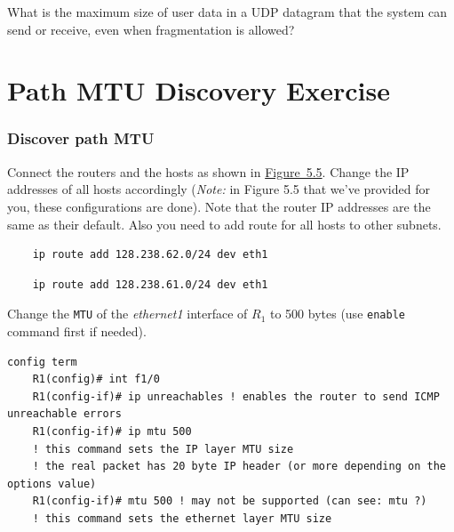 \documentclass{UTNetLab}
\begin{document}
    \begin{report}
    \item What is the maximum size of user data in a UDP datagram that the system can send or receive, even when fragmentation is allowed?
    \end{report}


\part{Path MTU Discovery Exercise}\label{sec:PMTUD}

\section{Discover path MTU}
    Connect the routers and the hosts as shown in \hyperref[fig:5.5]{Figure~5.5}. Change the IP addresses of all hosts accordingly (\textit{Note: }in Figure 5.5 that we've provided for you, these configurations are done).
    Note that the router IP addresses are the same as their default. Also you need to add route for all hosts to other subnets.
       
    \begin{lstlisting}
    ip route add 128.238.62.0/24 dev eth1            
    \end{lstlisting} 

    
    \begin{lstlisting}
    ip route add 128.238.61.0/24 dev eth1
    \end{lstlisting}


    Change the \texttt{MTU} of the \textit{ethernet1} interface of \textit{$R_{1}$} to 500 bytes (use \lstinline{enable} command first if needed).
    
\begin{lstlisting}[frame=trBL,language={cisco}]
	config term
	R1(config)# int f1/0
	R1(config-if)# ip unreachables ! enables the router to send ICMP unreachable errors
	R1(config-if)# ip mtu 500
	! this command sets the IP layer MTU size
	! the real packet has 20 byte IP header (or more depending on the options value)
	R1(config-if)# mtu 500 ! may not be supported (can see: mtu ?)
	! this command sets the ethernet layer MTU size

\end{lstlisting}
\end{document}
